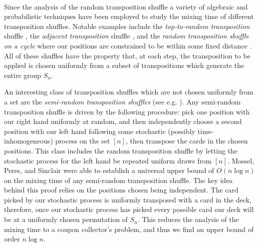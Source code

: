 \documentclass[11pt]{report}
\begin{document}
\paragraph{}
Since the analysis of the random transposition shuffle a variety of algebraic and probabilistic techniques have been 
employed to study the mixing time of different transposition shuffles. Notable 
examples include the \emph{top-to-random transposition} shuffle 
\cite{saloff2004random}, the \emph{adjacent transposition} shuffle 
\cite{lacoin2016mixing}, and the \emph{random transposition  shuffle on a cycle} where our positions are constrained to be within some fixed distance \cite{berestycki2012}. All of these shuffles have the property 
that, at each step, the transposition to be applied is chosen uniformly 
from a subset of transpositions which generate the entire group $S_n$.

An interesting class of transposition shuffles which are not chosen uniformly from a set are the \emph{semi-random transposition shuffles}  (see e.g. \cite{Mossel2004, Pymar2011, pinsky2012cyclic}).
Any semi-random transposition shuffle is driven by the following procedure: pick one position with our right hand uniformly at random, and then independently choose a second position with our left hand following some stochastic (possibly time-inhomogeneous) process on the set $[n]$, then transpose the cards in the chosen positions. This class includes the random transposition shuffle by letting the stochastic process for the left hand be repeated uniform draws from $[n]$.  Mossel, Peres, and 
Sinclair \cite{Mossel2004} were able to establish a universal upper bound of $O(n \log n)$ on the mixing time of any semi-random transposition shuffle. The key idea behind this proof relies on the positions chosen being independent. The card picked by our stochastic process is uniformly transposed with a card in the deck, therefore, once our stochastic process has picked every possible card
our deck will be at a uniformly chosen permutation of $S_{n}$. This reduces the analysis of the mixing time to a coupon collector's problem, and thus we find an upper bound of order $n\log n$.
\end{document}
